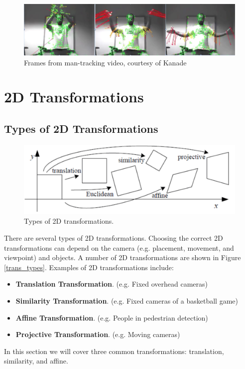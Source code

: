 \documentclass{article}
\begin{document}
\begin{figure}[h]
  \centering
  \includegraphics[width=\linewidth]{man_track.png}
  \caption{Frames from man-tracking video, courtesy of Kanade}
\end{figure}

\section{2D Transformations}
\subsection{Types of 2D Transformations}
\begin{figure}[h]
  \centering
  \includegraphics[width=0.8\linewidth]{trans_types.png}
  \caption{Types of 2D transformations.}
\end{figure}\label{trans_types}

There are several types of 2D transformations.
Choosing the correct 2D transformations can depend on the camera (e.g. placement, movement, and viewpoint) and objects.
A number of 2D transformations are shown in Figure \ref{trans_types}.
Examples of 2D transformations include:
\begin{itemize}
	\item \textbf{Translation Transformation}. (e.g. Fixed overhead cameras)
    \item \textbf{Similarity Transformation}. (e.g. Fixed cameras of a basketball game)
    \item \textbf{Affine Transformation}. (e.g. People in pedestrian detection)
    \item \textbf{Projective Transformation}. (e.g. Moving cameras)
\end{itemize}
In this section we will cover three common transformations: translation, similarity, and affine.
\end{document}
